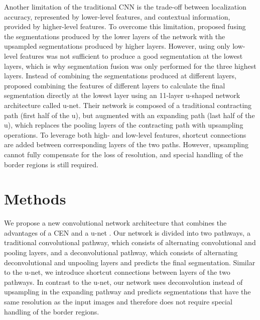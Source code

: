 Another limitation of the traditional CNN is the trade-off between localization
accuracy, represented by lower-level features, and contextual information,
provided by higher-level features. To overcome this limitation, \citet{long2015}
proposed fusing the segmentations produced by the lower layers of the network
with the upsampled segmentations produced by higher layers. However, using only
low-level features was not sufficient to produce a good segmentation at the
lowest layers, which is why segmentation fusion was only performed for the three
highest layers. Instead of combining the segmentations produced at different
layers, \citet{ronneberger2015} proposed combining the features of different
layers to calculate the final segmentation directly at the lowest layer using an
11-layer u-shaped network architecture called u-net. Their network is composed
of a traditional contracting path (first half of the u), but augmented with an
expanding path (last half of the u), which replaces the pooling layers of the
contracting path with upsampling operations. To leverage both high- and
low-level features, shortcut connections are added between corresponding layers
of the two paths. However, upsampling cannot fully compensate for the loss of
resolution, and special handling of the border regions is still required.


\section{Methods}
\label{sec:method}

We propose a new convolutional network architecture that combines the advantages
of a CEN \citep{brosch2015} and a u-net \citep{ronneberger2015}. Our
network is divided into two pathways, a traditional convolutional pathway, which
consists of alternating convolutional and pooling layers, and a deconvolutional
pathway, which consists of alternating deconvolutional and unpooling layers and
predicts the final segmentation. Similar to the u-net, we introduce shortcut
connections between layers of the two pathways. In contrast to the u-net, our
network uses deconvolution instead of upsampling in the expanding pathway and
predicts segmentations that have the same resolution as the input images and
therefore does not require special handling of the border regions.

